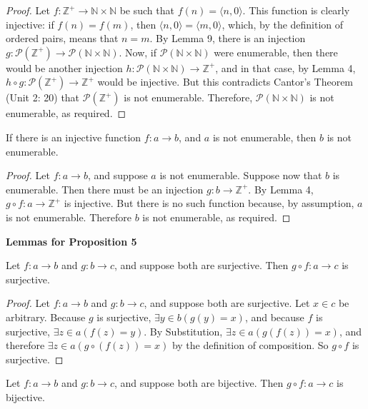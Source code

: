 \documentclass{article}
\begin{document}
 \begin{proof} Let $f: \mathbb{Z^+} \rightarrow \mathbb{N} \times \mathbb{N}$ be such that $f(n) = \langle n, 0 \rangle$. This function is clearly injective: if $f(n) = f(m)$, then $\langle n, 0 \rangle = \langle m, 0 \rangle$, which, by the definition of ordered pairs, means that $n = m$. By Lemma 9, there is an injection $g: \mathscr{P}(\mathbb{Z^+}) \rightarrow \mathscr{P}(\mathbb{N} \times \mathbb{N})$. Now, if $\mathscr{P}(\mathbb{N} \times \mathbb{N})$ were enumerable, then there would be another injection $h: \mathscr{P}(\mathbb{N} \times \mathbb{N}) \rightarrow \mathbb{Z^+}$, and in that case, by Lemma 4, $h \circ g:  \mathscr{P}(\mathbb{Z^+}) \rightarrow \mathbb{Z^+}$ would be injective. But this contradicts Cantor's Theorem (Unit 2: 20) that $\mathscr{P}(\mathbb{Z^+})$ is not enumerable. Therefore, $\mathscr{P}(\mathbb{N} \times \mathbb{N})$ is not enumerable, as required.
 \end{proof}
\begin{proposition}
If there is an injective function $f: a \rightarrow b$, and $a$ is not enumerable, then $b$ is not enumerable.
\end{proposition}
\begin{proof} Let $f: a \rightarrow b$, and suppose $a$ is not enumerable. Suppose now that $b$ is enumerable. Then there must be an injection $g: b \rightarrow \mathbb{Z^+}$. By Lemma 4, $g \circ f: a \rightarrow \mathbb{Z^+}$ is injective. But there is no such function because, by assumption, $a$ is not enumerable. Therefore $b$ is not enumerable, as required. \end{proof}
\textbf{Lemmas for Proposition 5}
\begin{lemma} Let $f: a \rightarrow b$ and $g: b \rightarrow c$, and suppose both are surjective. Then $g \circ f: a \rightarrow c$ is surjective. \end{lemma}
\begin{proof} Let $f: a \rightarrow b$ and $g: b \rightarrow c$, and suppose both are surjective. Let $x \in c$ be arbitrary. Because $g$ is surjective, $\exists y \in b(g(y) = x)$, and because $f$ is surjective,  $\exists z \in a(f(z) = y)$. By Substitution, $\exists z \in a(g(f(z)) = x)$, and therefore  $\exists z \in a(g \circ(f(z)) = x)$ by the definition of composition. So $g \circ f$ is surjective. \end{proof}
\begin{lemma} Let $f: a \rightarrow b$ and $g: b \rightarrow c$, and suppose both are bijective. Then $g \circ f: a \rightarrow c$ is bijective. \end{lemma}
\end{document}
